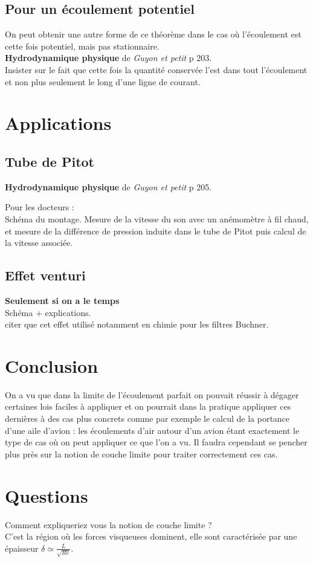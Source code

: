 \documentclass[12pt,prb,aps,epsf]{article}
\begin{document}
\subsection{Pour un écoulement potentiel}
On peut obtenir une autre forme de ce théorème dans le cas où l'écoulement est cette fois potentiel, mais pas stationnaire.\\
\textbf{Hydrodynamique physique} de \textit{Guyon et petit} p 203.\\
Insister sur le fait que cette fois la quantité conservée l'est dans tout l'écoulement et non plus seulement le long d'une ligne de courant.

\section{Applications}
\subsection{Tube de Pitot}
\textbf{Hydrodynamique physique} de \textit{Guyon et petit} p 205.

Pour les docteurs :\\
Schéma du montage. Mesure de la vitesse du son avec un anémomètre à fil chaud, et mesure de la différence de pression induite dans le tube de Pitot puis calcul de la vitesse associée.

\subsection{Effet venturi}
\textbf{Seulement si on a le temps}\\
Schéma + explications.\\
citer que cet effet utilisé notamment en chimie pour les filtres Buchner.

\section{Conclusion}
On a vu que dans la limite de l'écoulement parfait on pouvait réussir à dégager certaines lois faciles à appliquer et on pourrait dans la pratique appliquer ces dernières à des cas plus concrets comme par exemple le calcul de la portance d'une aile d'avion : les écoulements d'air autour d'un avion étant exactement le type de cas où on peut appliquer ce que l'on a vu. Il faudra cependant se pencher plus près sur la notion de couche limite pour traiter correctement ces cas.


\section*{Questions}
Comment expliqueriez vous la notion de couche limite ?\\
C'est la région où les forces visqueuses dominent, elle sont caractérisée par une épaisseur $\delta \simeq \frac{L}{\sqrt{Re}}$.\\
\end{document}
